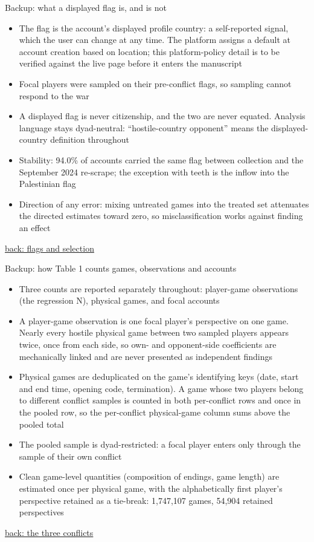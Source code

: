 \documentclass[aspectratio=169,11pt,t]{beamer}
\newcommand{\backto}[2]{\vfill\hfill\hyperlink{#1}{\textcolor{linkblue}{\scriptsize\textsf{back: #2}}}}
\begin{document}
\begin{frame}[label=bk-flagmeaning]{Backup: what a displayed flag is, and is not}
  \begin{itemize}
    \item The flag is the account's displayed profile country: a self-reported signal, which the user can change at any time. The platform assigns a default at account creation based on location; this platform-policy detail is to be verified against the live page before it enters the manuscript
    \item Focal players were sampled on their pre-conflict flags, so sampling cannot respond to the war
    \item A displayed flag is never citizenship, and the two are never equated. Analysis language stays dyad-neutral: ``hostile-country opponent'' means the displayed-country definition throughout
    \item Stability: 94.0\% of accounts carried the same flag between collection and the September 2024 re-scrape; the exception with teeth is the inflow into the Palestinian flag
    \item Direction of any error: mixing untreated games into the treated set attenuates the directed estimates toward zero, so misclassification works against finding an effect
  \end{itemize}
  \backto{flags}{flags and selection}
\end{frame}

\begin{frame}[label=bk-table1]{Backup: how Table 1 counts games, observations and accounts}
  \small
  \begin{itemize}
    \item Three counts are reported separately throughout: player-game observations (the regression N), physical games, and focal accounts
    \item A player-game observation is one focal player's perspective on one game. Nearly every hostile physical game between two sampled players appears twice, once from each side, so own- and opponent-side coefficients are mechanically linked and are never presented as independent findings
    \item Physical games are deduplicated on the game's identifying keys (date, start and end time, opening code, termination). A game whose two players belong to different conflict samples is counted in both per-conflict rows and once in the pooled row, so the per-conflict physical-game column sums above the pooled total
    \item The pooled sample is dyad-restricted: a focal player enters only through the sample of their own conflict
    \item Clean game-level quantities (composition of endings, game length) are estimated once per physical game, with the alphabetically first player's perspective retained as a tie-break: 1,747,107 games, 54,904 retained perspectives
  \end{itemize}
  \backto{bk-table1-main}{the three conflicts}
\end{frame}
\end{document}
